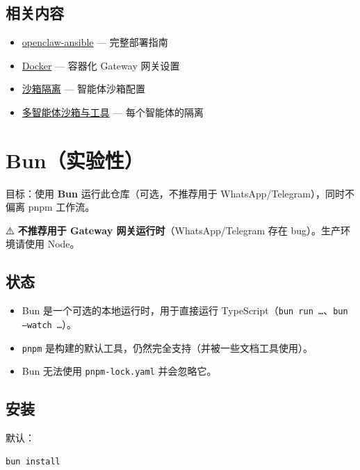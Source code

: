 \subsection{相关内容}


\begin{itemize}
  \item \href{https://github.com/openclaw/openclaw-ansible}{openclaw-ansible} — 完整部署指南
  \item \href{/install/docker}{Docker} — 容器化 Gateway 网关设置
  \item \href{/gateway/sandboxing}{沙箱隔离} — 智能体沙箱配置
  \item \href{/tools/multi-agent-sandbox-tools}{多智能体沙箱与工具} — 每个智能体的隔离
\end{itemize}



\clearpage

\section{Bun（实验性）}


目标：使用 \textbf{Bun} 运行此仓库（可选，不推荐用于 WhatsApp/Telegram），同时不偏离 pnpm 工作流。

⚠️ \textbf{不推荐用于 Gateway 网关运行时}（WhatsApp/Telegram 存在 bug）。生产环境请使用 Node。

\subsection{状态}


\begin{itemize}
  \item Bun 是一个可选的本地运行时，用于直接运行 TypeScript（\texttt{bun run …}、\texttt{bun --watch …}）。
  \item \texttt{pnpm} 是构建的默认工具，仍然完全支持（并被一些文档工具使用）。
  \item Bun 无法使用 \texttt{pnpm-lock.yaml} 并会忽略它。
\end{itemize}


\subsection{安装}


默认：

\begin{lstlisting}[language=bash]
bun install
\end{lstlisting}



